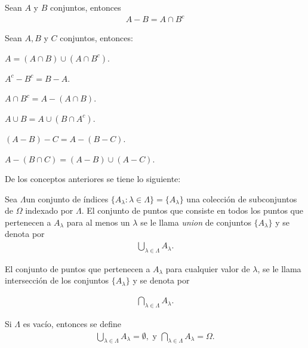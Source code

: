 \begin{Teo}
Sean $A$ y $B$ conjuntos, entonces
\begin{eqnarray*}
A-B=A\cap B^{c}
\end{eqnarray*}
\end{Teo}


\begin{Teo}
Sean $A,B$ y $C$ conjuntos, entonces:
\item $A = (A \cap B) \cup (A \cap B^{c}).$

\item $A^{c} - B^{c} = B - A.$

\item $A \cap B^{c} = A - (A \cap B).$

\item $A \cup B = A \cup (B \cap A^{c}).$

\item $(A - B) - C = A - (B - C).$

\item $A - (B \cap C) = (A - B) \cup (A - C).$
\end{Teo}

De los conceptos anteriores se tiene lo siguiente:
\begin{Def}Sea $\Lambda$un conjunto de \'indices $\{A_\lambda : \lambda \in \Lambda\} = \{A_\lambda\}$ una colecci\'on de subconjuntos de $\Omega$ indexado por $\Lambda$. El conjunto de puntos que consiste en todos los puntos que pertenecen a $A_{\lambda}$ para al menos un $\lambda$ se le llama \emph{union} de conjuntos $\{A_\lambda\}$ y se denota por
\begin{eqnarray*}
\bigcup_{\lambda \in \Lambda} A_\lambda .
\end{eqnarray*}

El conjunto de puntos que pertenecen a $A_\lambda$ para cualquier valor de $\lambda$, se le llama intersecci\'on de los conjuntos $\{A_\lambda\}$ y se denota por 

\begin{eqnarray*}
\bigcap_{\lambda \in \Lambda} A_\lambda .
\end{eqnarray*}

Si $\Lambda$ es vac\'io, entonces se define
\begin{eqnarray*}
\bigcup_{\lambda \in \Lambda} A_\lambda = \emptyset,\textrm{ y }
\bigcap_{\lambda \in \Lambda} A_\lambda = \Omega.
\end{eqnarray*}
\end{Def}

